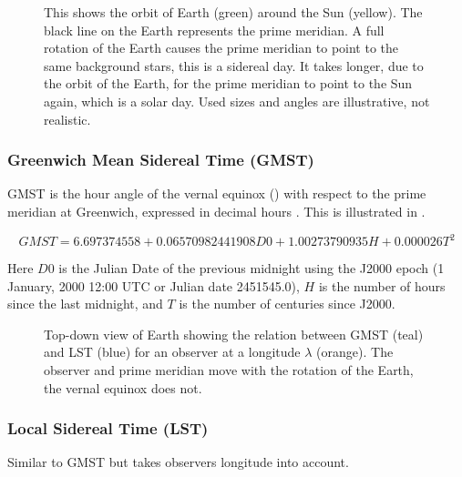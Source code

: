 \begin{figure}
    \centering
    
    \caption{This shows the orbit of Earth (green) around the Sun
             (yellow). The black line on the Earth represents the prime
             meridian. A full rotation of the Earth causes the prime
             meridian to point to the same background stars, this is a
             sidereal day. It takes longer, due to the orbit of the
             Earth, for the prime meridian to point to the Sun again,
             which is a solar day. Used sizes and angles are
             illustrative, not realistic.}
    \label{fig:sidereal_time}
\end{figure}


\subsubsection{Greenwich Mean Sidereal Time (GMST)}

GMST is the hour angle of the vernal equinox ()
with respect to the prime meridian at Greenwich, expressed in decimal
hours \cite{kaplan:2011aa}. This is illustrated in
.

\begin{equation}
    GMST = 6.697374558 + 0.06570982441908 D0 + 1.00273790935 H + 0.000026 T^2
\end{equation}

Here $D0$ is the Julian Date of the previous midnight using the J2000
epoch (1 January, 2000 12:00 UTC or Julian date 2451545.0), $H$ is the
number of hours since the last midnight, and $T$ is the number of
centuries since J2000.

\begin{figure}
    \centering
    
    \caption{Top-down view of Earth showing the relation between GMST
             (teal) and LST (blue) for an observer at a longitude
             $\lambda$ (orange). The observer and prime meridian move with
             the rotation of the Earth, the vernal equinox does not.}
    \label{fig:wgs84_gmst_lst}
\end{figure}


\subsubsection{Local Sidereal Time (LST)}

Similar to GMST but takes observers longitude into account.

